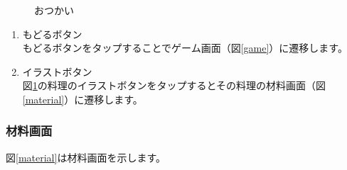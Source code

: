 \documentclass[a4j]{jarticle}
\begin{document}
\begin{figure}[H]
    \begin{center}
    \caption {おつかい}
    \label{otukai1}
    \end{center}
\end{figure}

\begin{enumerate}
  \renewcommand{\labelenumi}{\textcircled{\scriptsize \theenumi}}
\item もどるボタン\\
  もどるボタンをタップすることでゲーム画面（図\ref{game}）に遷移します。
\item イラストボタン\\
  図\ref{otukai1}の料理のイラストボタンをタップするとその料理の材料画面（図\ref{material}）に遷移します。
\end{enumerate}

\newpage
\subsubsection{材料画面}
図\ref{material}は材料画面を示します。\\
\end{document}
